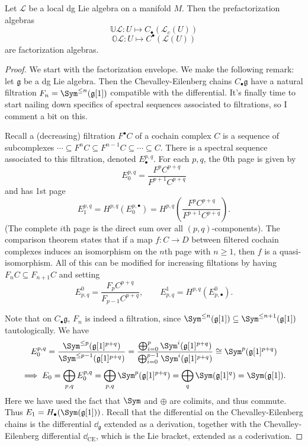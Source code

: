 \begin{theorem}\label{thm:6-5-4}
	Let $\mathcal{L} $ be a local dg Lie algebra on a manifold $M$. Then the prefactorization algebras
	\[
		\mathbb{U} \mathcal{L} : U \mapsto C_{\bullet} (\mathcal{L} _c(U))
	\]
	\[
		\mathbb{O} \mathcal{L} : U\mapsto C^{\bullet} (\mathcal{L}(U))
	\]
	are factorization algebras.
\end{theorem}
\begin{proof}
	We start with the factorization envelope. We make the following remark: let $\mathfrak{g} $ be a dg Lie algebra. Then the Chevalley-Eilenberg chains $C_{\bullet} \mathfrak{g}$ have a natural filtration $F_n = \Sym ^{\leq n} (\mathfrak{g} [1])$ compatible with the differential. It's finally time to start nailing down specifics of spectral sequences associated to filtrations, so I comment a bit on this.

	Recall a (decreasing) filtration $F^{\bullet} C$ of a cochain complex $C$ is a sequence of subcomplexes $\cdots \subseteq F^nC \subseteq F^{n-1} C \subseteq \cdots \subseteq C$. There is a spectral sequence associated to this filtration, denoted $E^{p,q}_{\bullet} $. For each $p,q$, the 0th page is given by
	\[
		E^{p,q}_0 = \frac{F^pC^{p+q} }{F^{p+1} C^{p+q} } 
	\]
	and has 1st page
	\[
		E^{p,q}_1 = H^{p,q} (E_0^{p,\bullet} )= H^{p,q} \left( \frac{F^pC^{p+q} }{F^{p+1} C^{p+q} }  \right) 
	.\]
	(The complete $i$th page is the direct sum over all $(p,q)$-components). The comparison theorem states that if a map $f : C \to D$ between filtered cochain complexes induces an isomorphism on the $n$th page with $n\geq 1$, then $f$ is a quasi-isomorphism. All of this can be modified for increasing filtations by having $F_nC \subseteq F_{n+1} C$ and setting
	\[
		E_{p,q} ^0 = \frac{F_{p} C^{p+q} }{F_{p-1} C^{p+q} } ,\qquad E^1_{p,q} =H^{p,q} (E^0_{p,\bullet} )
	.\]
	
	Note that on $C_{\bullet} \mathfrak{g} $, $F_n$ is indeed a filtration, since $\Sym ^{\leq n} (\mathfrak{g} [1])\subseteq \Sym ^{\leq n+1} (\mathfrak{g} [1])$ tautologically. We have
	\[
		E^{p,q}_0 = \frac{\Sym^{\leq p} (\mathfrak{g}[1]^{p+q} )}{\Sym ^{\leq p-1} (\mathfrak{g} [1]^{p+q} )} = \frac{\bigoplus_{i=0}^{p} \Sym ^i(\mathfrak{g} [1]^{p+q} )}{\bigoplus_{i=0}^{p-1} \Sym ^i(\mathfrak{g} [1]^{p+q} )} \cong \Sym^p(\mathfrak{g} [1]^{p+q}) 
	\]
	\[
		\implies E_0 = \bigoplus_{p,q} E^{p,q}_0 = \bigoplus_{p,q} \Sym ^p(\mathfrak{g}[1]^{p+q} )=\bigoplus_{q} \Sym (\mathfrak{g}[1]^q) = \Sym (\mathfrak{g} [1])
	.\]
	Here we have used the fact that $\Sym $ and $\oplus $ are colimits, and thus commute. Thus $E_1 = H_{\bullet} (\Sym (\mathfrak{g} [1]))$. Recall that the differential on the Chevalley-Eilenberg chains is the differential $\dd _{\mathfrak{g} } $ extended as a derivation, together with the Chevalley-Eilenberg differential $\dd _{\mathrm{CE} } $, which is the Lie bracket, extended as a coderivation.


\end{proof}
